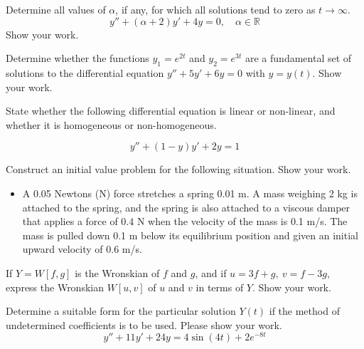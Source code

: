 \documentclass[12pt]{exam}
\begin{document}
    


\newpage


\Initials

\begin{questions}

    \question[2] Determine all values of $\alpha$, if any, for which all solutions tend to zero as $t\to\infty$. $$y'' +(\alpha+2)y'+4y = 0 , \quad \alpha \in \mathbb R$$ Show your work. \vspace{6cm}  
    
    \question[2] Determine whether the functions $y_1 = e^{2t}$ and $y_2 = e^{3t} $ are a fundamental set of solutions to the differential equation $y''+5y'+6y = 0$ with $y=y(t)$. Show your work. 
    
    \newpage
    
    \question[1] State whether the following differential equation is linear or non-linear, and whether it is homogeneous or non-homogeneous. 
    
    $$y'' + (1-y)y' + 2y = 1$$
    
    \vspace{4cm}
    
    \question[3] Construct an initial value problem for the following situation. Show your work.  

    \begin{itemize}
        \item[] A 0.05 Newtons (N) force stretches a spring 0.01 m. A mass weighing 2 kg is attached to the spring, and the spring is also attached to a viscous damper that applies a force of 0.4 N when the velocity of the mass is 0.1 m/s. The mass is pulled down 0.1 m below its equilibrium position and given an initial upward velocity of 0.6 m/s. 
    \end{itemize}
    
    
    \newpage \Initials
    
    \question[3] If $Y = W[f, g]$ is the Wronskian of $f$ and $g$, and if $u=3f+g, \ v=f-3g$, express the Wronskian $W[u,v]$ of $u$ and $v$ in terms of $Y$. Show your work. 
    
    \vspace{8cm}
    
    \question[3] Determine a suitable form for the particular solution \(Y(t)\) if the method of undetermined coefficients is to be used. Please show your work. 
    $$y''+ 11y'+24y = 4\sin(4t)+2e^{-8t}$$    
    

\end{questions}
\end{document}
